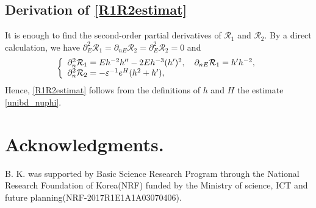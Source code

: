 \documentclass{amsart}
\newcommand{\veps}{\varepsilon}
\numberwithin{equation}{section}
\theoremstyle{plain}%
\theoremstyle{definition}
\theoremstyle{remark}
\theoremstyle{remark}
\begin{document}
\subsection{Derivation of \eqref{R1R2estimat}} It is enough to find the second-order partial derivatives of $\mathcal{R}_1$ and $\mathcal{R}_2$. By a direct calculation, we have   $\partial^2_E\mathcal{R}_1=\partial_{nE}\mathcal{R}_2 = \partial_E^2 \mathcal{R}_2 = 0$ and
\[
\left\{
\begin{array}{l l}
\partial_{n}^2\mathcal{R}_1 = Eh^{-2}h'' - 2Eh^{-3}(h')^2 , \quad \partial_{nE} \mathcal{R}_1 = h'h^{-2}, \\
\partial_{n}^2\mathcal{R}_2 = -\veps^{-1}e^{H}(h^2 +h' ),
\end{array}
\right.
\]
Hence, \eqref{R1R2estimat} follows from the definitions of $h$ and $H$ the estimate \eqref{unibd_nuphi}.





  \section*{Acknowledgments.}
B. K. was supported by Basic Science Research Program through the National Research Foundation of Korea(NRF) funded by the Ministry of science, ICT and future planning(NRF-2017R1E1A1A03070406).
\end{document}
